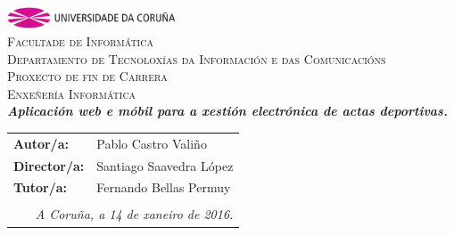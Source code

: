\begin{titlepage}
\begin{center}
\includegraphics[width=5cm]{img/anagramaUDC.png}\\[0.5cm]
{\textsc{Facultade de Informática}} \\
{\large \textsc{Departamento de Tecnoloxías da Información e das Comunicacións}} \\[1cm]
{\Large \textsc{Proxecto de fin de Carrera}} \\
{\Large \textsc{Enxeñería Informática}} \\[2cm]
{\Large \textsl{\textbf{Aplicación web e móbil para a xestión electrónica de actas 
deportivas.}}} \\[0.15cm]
\vfill
\begin{flushright}
\begin{tabular}{ll}
\textbf{Autor/a:}    & Pablo Castro Valiño \\
\textbf{Director/a:} & Santiago Saavedra López\\
\textbf{Tutor/a:} & Fernando Bellas Permuy\\
& \\
\multicolumn{2}{r}{\small \emph{A Coruña, a 14 de xaneiro de 2016.}} \\
\end{tabular}
\end{flushright}
\end{center}
\end{titlepage}
